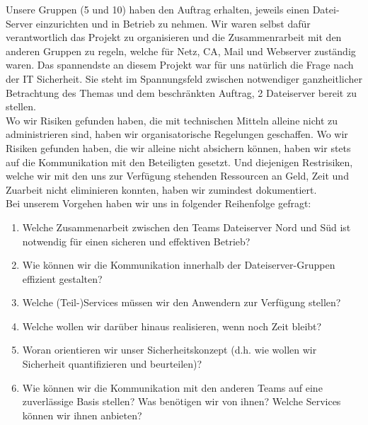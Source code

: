 Unsere Gruppen (5 und 10) haben den Auftrag erhalten, jeweils einen Datei-Server einzurichten und in Betrieb zu nehmen. Wir waren selbst dafür verantwortlich das Projekt zu organisieren und die Zusammenrarbeit mit den anderen Gruppen zu regeln, welche für Netz, CA, Mail und Webserver zuständig waren. Das spannendste an diesem Projekt war für uns natürlich die Frage nach der IT Sicherheit. Sie steht im Spannungsfeld zwischen notwendiger ganzheitlicher Betrachtung des Themas und dem beschränkten Auftrag, 2 Dateiserver bereit zu stellen.\\

Wo wir Risiken gefunden haben, die mit technischen Mitteln alleine nicht zu administrieren sind, haben wir organisatorische Regelungen geschaffen. Wo wir Risiken gefunden haben, die wir alleine nicht absichern können, haben wir stets auf die Kommunikation mit den Beteiligten gesetzt. Und diejenigen Restrisiken, welche wir mit den uns zur Verfügung stehenden Ressourcen an Geld, Zeit und Zuarbeit nicht eliminieren konnten, haben wir zumindest dokumentiert.\\

Bei unserem Vorgehen haben wir uns in folgender Reihenfolge gefragt:

\begin{enumerate}
\item Welche Zusammenarbeit zwischen den Teams Dateiserver Nord und Süd ist \newline notwendig für einen sicheren und effektiven Betrieb?
\item Wie können wir die Kommunikation innerhalb der Dateiserver-Gruppen effizient \newline gestalten?
\item Welche (Teil-)Services müssen wir den Anwendern zur Verfügung stellen?
\item Welche wollen wir darüber hinaus realisieren, wenn noch Zeit bleibt?
\item Woran orientieren wir unser Sicherheitskonzept
(d.h. wie wollen wir Sicherheit \newline quantifizieren und beurteilen)?
\item Wie können wir die Kommunikation mit den anderen Teams auf eine zuverlässige Basis stellen? Was benötigen wir von ihnen? Welche Services können wir ihnen anbieten?
\end{enumerate}


